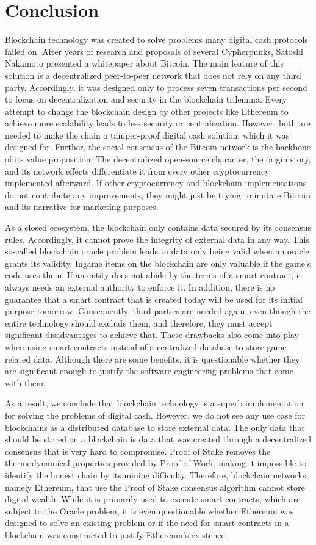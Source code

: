 \chapter{Conclusion}
Blockchain technology was created to solve problems many digital cash protocols failed on.
After years of research and proposals of several Cypherpunks, Satoshi Nakamoto presented a whitepaper about Bitcoin.
The main feature of this solution is a decentralized peer-to-peer network that does not rely on any third party.
Accordingly, it was designed only to process seven transactions per second to focus on decentralization and security in the blockchain trilemma.
Every attempt to change the blockchain design by other projects like Ethereum to achieve more scalability leads to less security or centralization.
However, both are needed to make the chain a tamper-proof digital cash solution, which it was designed for.
Further, the social consensus of the Bitcoin network is the backbone of its value proposition.
The decentralized open-source character, the origin story, and its network effects differentiate it from every other cryptocurrency implemented afterward.
If other cryptocurrency and blockchain implementations do not contribute any improvements, they might just be trying to imitate Bitcoin and its narrative for marketing purposes.

As a closed ecosystem, the blockchain only contains data secured by its consensus rules.
Accordingly, it cannot prove the integrity of external data in any way.
This so-called blockchain oracle problem leads to data only being valid when an oracle grants its validity.
Ingame items on the blockchain are only valuable if the game's code uses them. 
If an entity does not abide by the terms of a smart contract, it always needs an external authority to enforce it.
In addition, there is no guarantee that a smart contract that is created today will be used for its initial purpose tomorrow.
Consequently, third parties are needed again, even though the entire technology should exclude them, and therefore, they must accept significant disadvantages to achieve that.
These drawbacks also come into play when using smart contracts instead of a centralized database to store game-related data. 
Although there are some benefits, it is questionable whether they are significant enough to justify the software engineering problems that come with them.

As a result, we conclude that blockchain technology is a superb implementation for solving the problems of digital cash.
However, we do not see any use case for blockchains as a distributed database to store external data.
The only data that should be stored on a blockchain is data that was created through a decentralized consensus that is very hard to compromise.
Proof of Stake removes the thermodynamical properties provided by Proof of Work, making it impossible to identify the honest chain by its mining difficulty.
Therefore, blockchain networks, namely Ethereum, that use the Proof of Stake consensus algorithm cannot store digital wealth.
While it is primarily used to execute smart contracts, which are subject to the Oracle problem, it is even questionable whether Ethereum was designed to solve an existing problem or if the need for smart contracts in a blockchain was constructed to justify Ethereum's existence.